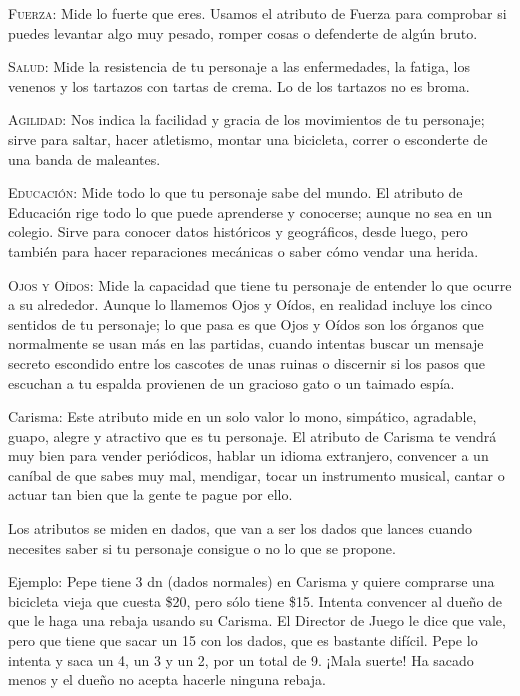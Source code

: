 \begin{description}
\item{\textsc{Fuerza:}}
Mide lo fuerte que eres. Usamos el atributo de Fuerza para comprobar si puedes levantar algo muy pesado, romper cosas o defenderte de algún bruto.

\item{\textsc{Salud:}}
Mide la resistencia de tu personaje a las enfermedades, la fatiga, los venenos y los tartazos con tartas de crema. Lo de los tartazos no es broma.

\item{\textsc{Agilidad:}}
Nos indica la facilidad y gracia de los movimientos de tu personaje; sirve para saltar, hacer atletismo, montar una bicicleta, correr o esconderte de una banda de maleantes.

\item{\textsc{Educación:}}
Mide todo lo que tu personaje sabe del mundo. El atributo de Educación rige todo lo que puede aprenderse y conocerse; aunque no sea en un colegio. Sirve para conocer datos históricos y geográficos, desde luego, pero también para hacer reparaciones mecánicas o saber cómo vendar una herida.

\item{\textsc{Ojos y Oídos:}}
Mide la capacidad que tiene tu personaje de entender lo que ocurre a su alrededor. Aunque lo llamemos Ojos y Oídos, en realidad incluye los cinco sentidos de tu personaje; lo que pasa es que Ojos y Oídos son los órganos que normalmente se usan más en las partidas, cuando intentas buscar un mensaje secreto escondido entre los cascotes de unas ruinas o discernir si los pasos que escuchan a tu espalda provienen de un gracioso gato o un taimado espía.

\item{Carisma:}
Este atributo mide en un solo valor lo mono, simpático, agradable, guapo, alegre y atractivo que es tu personaje. El atributo de Carisma te vendrá muy bien para vender periódicos, hablar un idioma extranjero, convencer a un caníbal de que sabes muy mal, mendigar, tocar un instrumento musical, cantar o actuar tan bien que la gente te pague por ello.

\end{description}

Los atributos se miden en dados, que van a ser los dados que lances cuando necesites saber si tu personaje consigue o no lo que se propone. 

Ejemplo: Pepe tiene 3 dn (dados normales) en Carisma y quiere comprarse una bicicleta vieja que cuesta \$20, pero sólo tiene \$15. Intenta convencer al dueño de que le haga una rebaja usando su Carisma. El Director de Juego le dice que vale, pero que tiene que sacar un 15 con los dados, que es bastante difícil. Pepe lo intenta y saca un 4, un 3 y un 2, por un total de 9. ¡Mala suerte! Ha sacado menos y el dueño no acepta hacerle ninguna rebaja.

